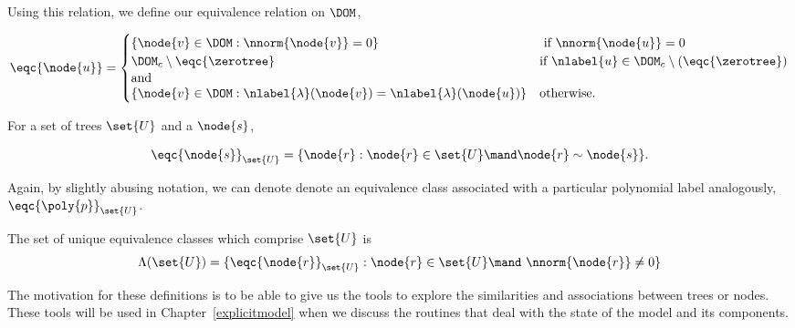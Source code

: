 Using this relation, we define our equivalence relation on $\DOM$,
\begin{definition}
  \begin{align}
    \eqc{\node{u}} = \begin{cases}
      \{\node{v} \in \DOM: \nnorm{\node{v}} = 0\} & \text{ if } \nnorm{\node{u}} = 0 \\
      \DOM_c\setminus\eqc{\zerotree} & \text{if } \nlabel{u}\in\DOM_c \setminus(\eqc{\zerotree})\\
      \intertext{and } 
      \{\node{v} \in \DOM: \nlabel{\lambda}({\node{v}}) = \nlabel{\lambda}({\node{u}})\} & \text{otherwise}.
    \end{cases}
  \end{align}
\end{definition}

For a set of trees $\set{U}$ and a $\node{s}$,
\begin{definition}
  \begin{equation}
    \eqc{\node{s}}_{\set{U}} = \{\node{r}: \node{r}\in\set{U} \mand\node{r}\sim\node{s}\}.
  \end{equation}
\end{definition}
Again, by slightly abusing notation, we can denote denote an
equivalence class associated with a particular polynomial label
analogously, $\eqc{\poly{p}}_{\set{U}}$.

\begin{definition}
The set of unique equivalence classes which comprise $\set{U}$ is
  \begin{equation*}
    \Lambda(\set{U}) = \{\eqc{\node{r}}_{\set{U}}: \node{r}\in\set{U} \mand\ \nnorm{\node{r}} \neq 0\}
  \end{equation*}
\end{definition}

The motivation for these definitions is to be able to give us the
tools to explore the similarities and associations between trees or
nodes. These tools will be used in Chapter~\ref{explicitmodel} when we
discuss the routines that deal with the state of the model and its
components.

